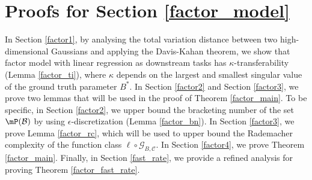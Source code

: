 \section{Proofs for Section \ref{factor_model}}

In Section \ref{factor1}, by analysing the total variation distance between two high-dimensional Gaussians and applying the Davis-Kahan theorem, we show that factor model with linear regression as downstream tasks has $\kappa$-transferability (Lemma \ref{factor_ti}), where $\kappa$ depends on the largest and smallest singular value of the ground truth parameter $B^* $. In Section \ref{factor2} and Section \ref{factor3}, we prove two lemmas that will be used in the proof of Theorem \ref{factor_main}. To be specific, in Section \ref{factor2}, we upper bound the bracketing number of the set $\mP(\mathcal{B})$ by using $\epsilon$-discretization (Lemma \ref{factor_bn}). In Section \ref{factor3}, we prove Lemma \ref{factor_rc}, which will be used to upper bound the Rademacher complexity of the function class $\ell\circ\mathcal{G}_{B,\mathcal{C}}$. In Section \ref{factor4}, we prove Theorem \ref{factor_main}.
Finally, in Section \ref{fast_rate}, we provide a refined analysis for proving Theorem \ref{factor_fast_rate}.













